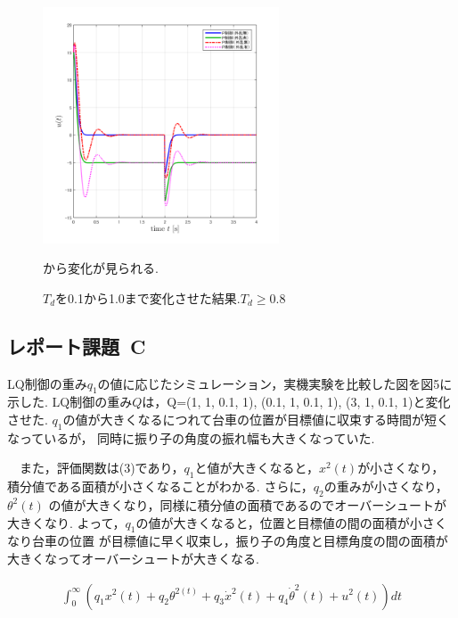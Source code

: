 \documentclass[twocolumn, 10pt,a4j]{jsarticle}
\begin{document}
  \begin{figure}[H]
    \centering
    \includegraphics[width=7cm]{../img/B-2.png}
    \caption{$T_{d}$を0.1から1.0まで変化させた結果.$T_{d} \geq 0.8$}から変化が見られる.
  \end{figure}

  \subsection{レポート課題~C}
    LQ制御の重み$q_{1}$の値に応じたシミュレーション，実機実験を比較した図を図5に示した.
    LQ制御の重み$Q$は，Q=(1, 1, 0.1, 1), (0.1, 1, 0.1, 1), (3, 1, 0.1, 1)と変化させた.
    $q_{1}$の値が大きくなるにつれて台車の位置が目標値に収束する時間が短くなっているが，
    同時に振り子の角度の振れ幅も大きくなっていた.
    \par　また，評価関数は(3)であり，$q_{1}$と値が大きくなると，$x^{2}(t)$が小さくなり，
    積分値である面積が小さくなることがわかる. さらに，$q_{2}$の重みが小さくなり，$\theta^{2}(t)$
    の値が大きくなり，同様に積分値の面積であるのでオーバーシュートが大きくなり.
    よって，$q_{1}$の値が大きくなると，位置と目標値の間の面積が小さくなり台車の位置
    が目標値に早く収束し，振り子の角度と目標角度の間の面積が大きくなってオーバーシュートが大きくなる.

    \begin{eqnarray}
      \int_{0}^{\infty}(q_{1} x^{2}(t) + q_{2} \theta^{2(t)} + q_{3} \dot{x}^{2}(t) + q_{4}\dot{\theta}^{2}(t) + u^{2}(t) )dt
    \end{eqnarray}
\end{document}
